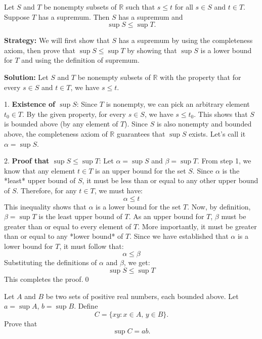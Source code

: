 \begin{problembox}
Let \( S \) and \( T \) be nonempty subsets of \( \mathbb{R} \) such that \( s \leq t \) for all \( s \in S \) and \( t \in T \). Suppose \( T \) has a supremum. Then \( S \) has a supremum and
\[
\sup S \leq \sup T.
\]
\end{problembox}

\noindent\textbf{Strategy:} We will first show that $S$ has a supremum by using the completeness axiom, then prove that $\sup S \leq \sup T$ by showing that $\sup S$ is a lower bound for $T$ and using the definition of supremum.

\bigskip\noindent\textbf{Solution:}
Let $S$ and $T$ be nonempty subsets of $\mathbb{R}$ with the property that for every $s \in S$ and $t \in T$, we have $s \leq t$.

1.  \textbf{Existence of $\sup S$}:
Since $T$ is nonempty, we can pick an arbitrary element $t_0 \in T$. By the given property, for every $s \in S$, we have $s \leq t_0$. This shows that $S$ is bounded above (by any element of $T$). Since $S$ is also nonempty and bounded above, the completeness axiom of $\mathbb{R}$ guarantees that $\sup S$ exists. Let's call it $\alpha = \sup S$.

2.  \textbf{Proof that $\sup S \leq \sup T$}:
Let $\alpha = \sup S$ and $\beta = \sup T$.
From step 1, we know that any element $t \in T$ is an upper bound for the set $S$.
Since $\alpha$ is the *least* upper bound of $S$, it must be less than or equal to any other upper bound of $S$. Therefore, for any $t \in T$, we must have:
\[
\alpha \leq t
\]
This inequality shows that $\alpha$ is a lower bound for the set $T$.
Now, by definition, $\beta = \sup T$ is the least upper bound of $T$. As an upper bound for $T$, $\beta$ must be greater than or equal to every element of $T$. More importantly, it must be greater than or equal to any *lower bound* of $T$.
Since we have established that $\alpha$ is a lower bound for $T$, it must follow that:
\[
\alpha \leq \beta
\]
Substituting the definitions of $\alpha$ and $\beta$, we get:
\[
\sup S \leq \sup T
\]
This completes the proof.\qed


\begin{problembox}
Let \( A \) and \( B \) be two sets of positive real numbers, each bounded above. Let \( a = \sup A \), \( b = \sup B \). Define
\[
C = \{ xy : x \in A,\, y \in B \}.
\]
Prove that
\[
\sup C = ab.
\]
\end{problembox}

